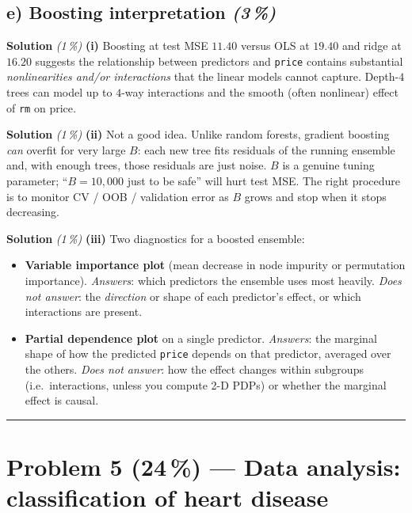 \documentclass[11pt,a4paper]{article}
\newcommand{\points}[1]{\textbf{(#1\,\%)}}
\newcommand{\subpoints}[1]{\textit{(#1\,\%)}}
\newcommand{\sol}{\noindent\textbf{Solution}}
\begin{document}
\subsection*{e) Boosting interpretation \subpoints{3}}

\sol{} \subpoints{1} \textbf{(i)} Boosting at test MSE $11.40$ versus OLS at $19.40$ and ridge at $16.20$
suggests the relationship between predictors and \texttt{price} contains substantial
\emph{nonlinearities and/or interactions} that the linear models cannot capture. Depth-$4$ trees can model
up to $4$-way interactions and the smooth (often nonlinear) effect of \texttt{rm} on price.

\medskip
\sol{} \subpoints{1} \textbf{(ii)} Not a good idea. Unlike random forests, gradient boosting \emph{can}
overfit for very large $B$: each new tree fits residuals of the running ensemble and, with enough trees,
those residuals are just noise. $B$ is a genuine tuning parameter; ``$B=10{,}000$ just to be safe'' will
hurt test MSE. The right procedure is to monitor CV / OOB / validation error as $B$ grows and stop when
it stops decreasing.

\medskip
\sol{} \subpoints{1} \textbf{(iii)} Two diagnostics for a boosted ensemble:
\begin{itemize}
  \item \textbf{Variable importance plot} (mean decrease in node impurity or permutation importance).
        \emph{Answers}: which predictors the ensemble uses most heavily. \emph{Does not answer}: the
        \emph{direction} or shape of each predictor's effect, or which interactions are present.
  \item \textbf{Partial dependence plot} on a single predictor.
        \emph{Answers}: the marginal shape of how the predicted \texttt{price} depends on that predictor,
        averaged over the others. \emph{Does not answer}: how the effect changes within subgroups (i.e.\
        interactions, unless you compute 2-D PDPs) or whether the marginal effect is causal.
\end{itemize}

\vspace{0.6em}
\hrule
\vspace{1em}

\section*{Problem 5 \points{24} --- Data analysis: classification of heart disease}
\end{document}
